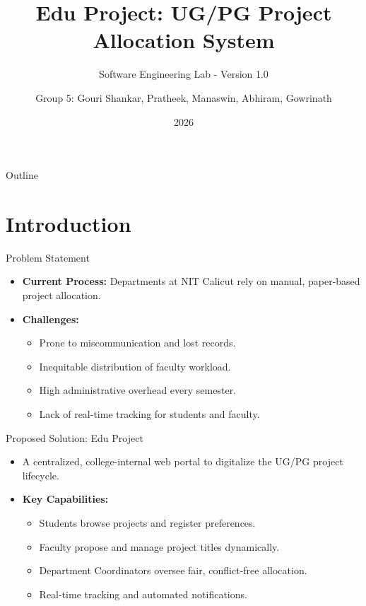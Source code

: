 \documentclass[aspectratio=169]{beamer}
\title{Edu Project: UG/PG Project Allocation System}
\subtitle{Software Engineering Lab - Version 1.0}
\author{Group 5: Gouri Shankar, Pratheek, Manaswin, Abhiram, Gowrinath}
\institute{National Institute of Technology (NIT) Calicut}
\date{2026}
\begin{document}
\begin{frame}
    \titlepage
\end{frame}

\begin{frame}{Outline}
    \tableofcontents
\end{frame}

\section{Introduction}

\begin{frame}{Problem Statement}
    \begin{itemize}
        \item \textbf{Current Process:} Departments at NIT Calicut rely on manual, paper-based project allocation.
        \item \textbf{Challenges:}
        \begin{itemize}
            \item Prone to miscommunication and lost records.
            \item Inequitable distribution of faculty workload.
            \item High administrative overhead every semester.
            \item Lack of real-time tracking for students and faculty.
        \end{itemize}
    \end{itemize}
\end{frame}

\begin{frame}{Proposed Solution: Edu Project}
    \begin{itemize}
        \item A centralized, college-internal web portal to digitalize the UG/PG project lifecycle.
        \item \textbf{Key Capabilities:}
        \begin{itemize}
            \item Students browse projects and register preferences.
            \item Faculty propose and manage project titles dynamically.
            \item Department Coordinators oversee fair, conflict-free allocation.
            \item Real-time tracking and automated notifications.
        \end{itemize}
    \end{itemize}
\end{frame}
\end{document}
